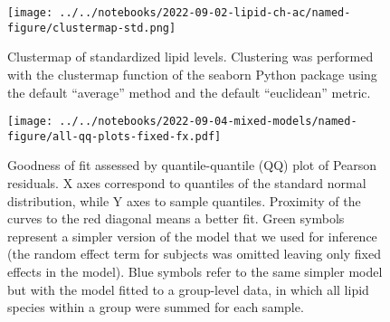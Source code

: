 \documentclass[letterpaper]{article}
\begin{document}
\begin{figure}[p]
	\texttt{[image: ../../notebooks/2022-09-02-lipid-ch-ac/named-figure/clustermap-std.png]}
	\caption[Clustermap of standardized lipid levels]{
	Clustermap of standardized lipid levels.  Clustering was performed with the
	clustermap function of the seaborn Python package using the default
	``average'' method and the default ``euclidean'' metric.
}
\label{fig:clustermap}
\end{figure}

\begin{figure}[p]
	\texttt{[image: ../../notebooks/2022-09-04-mixed-models/named-figure/all-qq-plots-fixed-fx.pdf]}
	\caption[Goodness of fit: normality of residuals]{
	Goodness of fit assessed by quantile-quantile (QQ) plot of Pearson
	residuals. X axes correspond to quantiles of the standard normal
	distribution, while Y axes to sample quantiles. Proximity of the curves to
	the red diagonal means a better fit. Green symbols represent a simpler
	version of the model that we used for inference (the random effect term for
	subjects was omitted leaving only fixed effects in the model). Blue symbols
	refer to the same simpler model but with the model fitted to a group-level
	data, in which all lipid species within a group were summed for each sample.
}
\label{fig:QQ-plots}
\end{figure}
\end{document}

